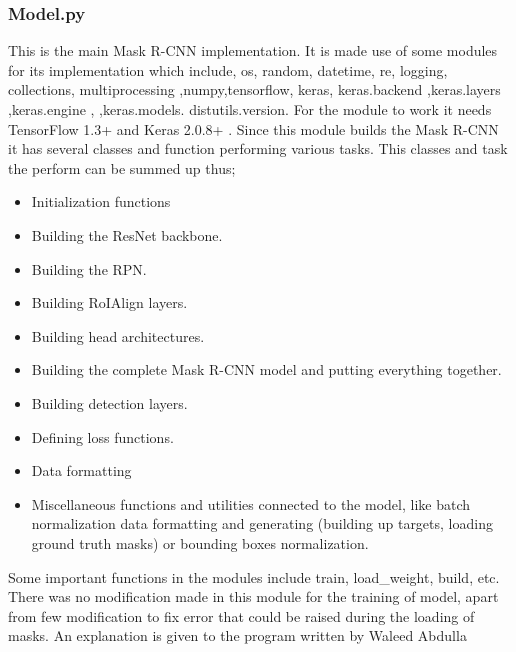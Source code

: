  \subsubsection{Model.py}
 This is the main Mask R-CNN implementation. It is made use of some modules for its implementation which include, os, random, datetime, re, logging, collections, multiprocessing ,numpy,tensorflow, keras, keras.backend ,keras.layers ,keras.engine , ,keras.models. distutils.version. For the module to work it needs TensorFlow 1.3+ and Keras 2.0.8+ .  Since this module builds the Mask R-CNN it has several classes and function performing various tasks. This classes and task the perform can be summed up thus;
 \begin{itemize}
   \item 	Initialization functions
   \item Building the ResNet backbone.
   \item Building the RPN.
   \item Building RoIAlign layers.
   \item Building head architectures.
   \item Building the complete Mask R-CNN model and putting everything together.
   \item Building detection layers.
   \item Defining loss functions.
   \item	Data formatting
   \item Miscellaneous functions and utilities connected to the model, like batch normalization data formatting and generating (building up targets, loading ground truth masks) or bounding boxes normalization.
   
 \end{itemize}
 Some important functions in the modules include train, load\_weight, build, etc. There was no modification made in this module for the training of model, apart from few modification to fix error that could be raised during the loading of masks. An explanation is given to the program written by Waleed Abdulla 